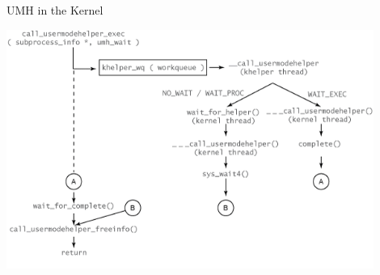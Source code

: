 \begin{reveals}
\begin{frame}[c]{UMH in the Kernel}
  \begin{center}
    \includegraphics[width=0.9\textwidth]{images/umh-kernel.png}
  \end{center}
  
\end{frame}

\end{reveals}
